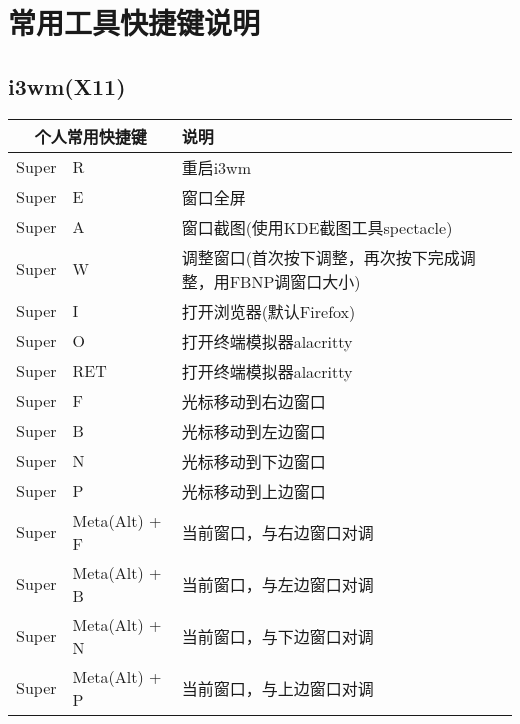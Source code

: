 \documentclass[11pt]{article}
\begin{document}
\newpage{}
\section{常用工具快捷键说明}
\subsection{i3wm(X11)}
\begin{center}
  \begin{tabular}{|c|l|l|}
    \hline
    \multicolumn{2}{|c|}{个人常用快捷键} & 说明 \\   
    \hline
    Super & R & 重启i3wm \\      
    Super & E & 窗口全屏 \\
    Super & A & 窗口截图(使用KDE截图工具spectacle) \\
    Super & W & 调整窗口(首次按下调整，再次按下完成调整，用FBNP调窗口大小) \\
    Super & I & 打开浏览器(默认Firefox) \\        
    Super & O & 打开终端模拟器alacritty \\  
    Super & RET & 打开终端模拟器alacritty \\
    Super & F & 光标移动到右边窗口 \\
    Super & B & 光标移动到左边窗口 \\
    Super & N & 光标移动到下边窗口 \\
    Super & P & 光标移动到上边窗口 \\
    Super & Meta(Alt) + F & 当前窗口，与右边窗口对调 \\
    Super & Meta(Alt) + B & 当前窗口，与左边窗口对调 \\
    Super & Meta(Alt) + N & 当前窗口，与下边窗口对调 \\
    Super & Meta(Alt) + P & 当前窗口，与上边窗口对调 \\
    \hline
  \end{tabular}  
\end{center}

\newpage{}
\end{document}

